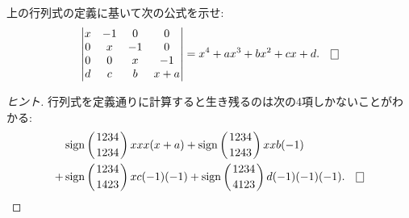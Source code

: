 \documentclass[12pt,twoside]{jarticle}
\begin{document}

\begin{question}
  上の行列式の定義に基いて次の公式を示せ:
  \begin{equation*}
    \begin{vmatrix}
      x & -1 &  0 &  0 \\
      0 &  x & -1 &  0 \\
      0 &  0 &  x & -1 \\
      d &  c &  b & x+a \\
    \end{vmatrix}
    = x^4 + ax^3 +bx^2 + cx + d.
    \qed
  \end{equation*}
\end{question}

\begin{proof}[ヒント]
  行列式を定義通りに計算すると生き残るのは次の4項しかないことがわかる:
  \begin{align*}
      &\sign\left(1234\atop1234\right) xxx(x+a)
    + \sign\left(1234\atop1243\right) xxb(-1) \\
    + &\sign\left(1234\atop1423\right) xc(-1)(-1)
    + \sign\left(1234\atop4123\right) d(-1)(-1)(-1).
    \qed
  \end{align*}
\end{proof}
\end{document}
